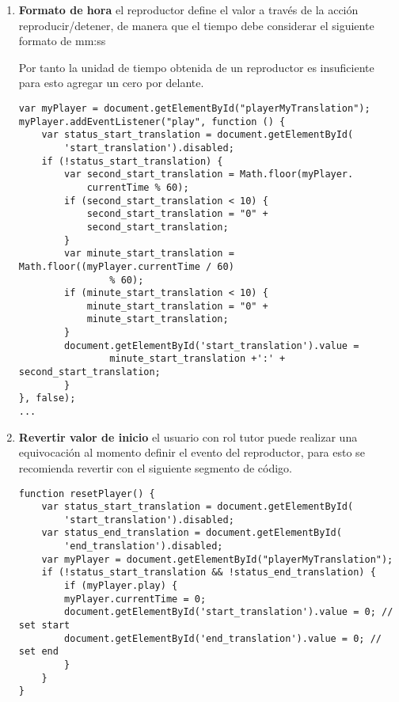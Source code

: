 \begin{itemize}
\begin{itemize}
\end{itemize}

\begin{enumerate}

\item \textbf{Formato de hora} el reproductor define el valor a través de
la acción reproducir/detener, de manera que el tiempo debe considerar el
siguiente formato de mm:ss

Por tanto la unidad de tiempo obtenida de un reproductor es insuficiente para
esto agregar un cero por delante.

\begin{lstlisting}[caption={Generador de formato para minuto y segundo.}]
var myPlayer = document.getElementById("playerMyTranslation");
myPlayer.addEventListener("play", function () {
    var status_start_translation = document.getElementById(
        'start_translation').disabled;
    if (!status_start_translation) {
        var second_start_translation = Math.floor(myPlayer.
            currentTime % 60);
        if (second_start_translation < 10) {
            second_start_translation = "0" + 
            second_start_translation;
        }
        var minute_start_translation = Math.floor((myPlayer.currentTime / 60)
                % 60);
        if (minute_start_translation < 10) {
            minute_start_translation = "0" + 
            minute_start_translation;
        }
        document.getElementById('start_translation').value = 
                minute_start_translation +':' + second_start_translation;
        }
}, false);
...
\end{lstlisting}

\item \textbf{Revertir valor de inicio} el usuario con rol tutor puede
realizar una equivocación al momento definir el evento del reproductor,
para esto se recomienda revertir con el siguiente segmento de código.

\begin{lstlisting}[caption={Revertir valor de tiempo y reproductor.}]
function resetPlayer() {
    var status_start_translation = document.getElementById(
        'start_translation').disabled;
    var status_end_translation = document.getElementById(
        'end_translation').disabled;
    var myPlayer = document.getElementById("playerMyTranslation");
    if (!status_start_translation && !status_end_translation) {
        if (myPlayer.play) {
        myPlayer.currentTime = 0;
        document.getElementById('start_translation').value = 0; // set start
        document.getElementById('end_translation').value = 0; // set end
        }
    }
}
\end{lstlisting}

\end{enumerate}

\end{itemize}

